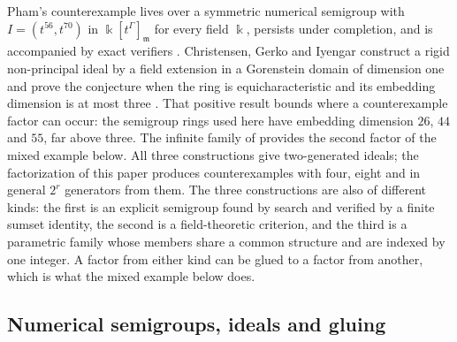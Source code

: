 \documentclass[11pt]{article}
\theoremstyle{definition}
\theoremstyle{remark}
\newcommand{\kk}{\Bbbk}
\begin{document}
Pham's counterexample lives over a symmetric numerical semigroup with $I=(t^{56},t^{70})$ in
$\kk[t^{\Gamma}]_{\mathfrak m}$ for every field $\kk$, persists under completion, and is accompanied by exact
verifiers \cite{Pham2026}. Christensen, Gerko and Iyengar construct a rigid non-principal ideal by a field
extension in a Gorenstein domain of dimension one and prove the conjecture when the ring is equicharacteristic and
its embedding dimension is at most three \cite{ChristensenGerkoIyengar2026}. That positive result bounds where a
counterexample factor can occur: the semigroup rings used here have embedding dimension $26$, $44$ and $55$, far
above three. The infinite family of \cite{SantibanezLeal2026} provides the second factor of the mixed example below. All
three constructions give two-generated ideals; the factorization of this paper produces counterexamples with four,
eight and in general $2^r$ generators from them. The three constructions are also of different kinds: the first is an
explicit semigroup found by search and verified by a finite sumset identity, the second is a field-theoretic criterion, and the
third is a parametric family whose members share a common structure and are indexed by one integer. A factor from either
kind can be glued to a factor from another, which is what the mixed example below does.

\subsection{Numerical semigroups, ideals and gluing}
\end{document}
